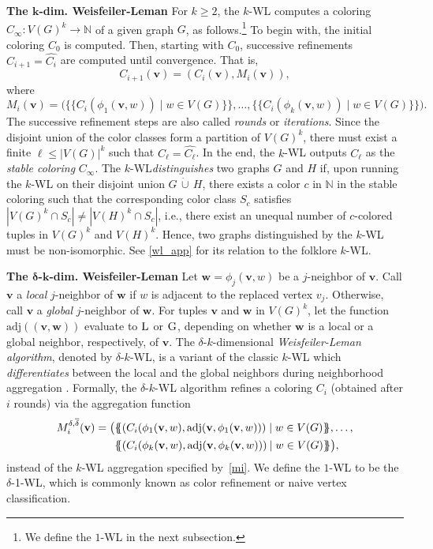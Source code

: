 \documentclass{article}
\newcommand{\xhdr}[1]{{\noindent\bfseries #1}}
\theoremstyle{definition}
\newcommand{\new}[1]{\emph{#1}}
\newcommand{\ndelta}{\ensuremath{\overline{\delta}}}
\renewcommand{\vec}[1]{\mathbf{#1}}
\newcommand{\kwl}{$k$-\textsf{WL}\xspace}
\newcommand{\deltakwl}{$\delta$-$k$-\textsf{WL}\xspace}
\begin{document}
\xhdr{The $\boldsymbol{k}$-dim. Weisfeiler-Leman} For $k\geq 2$, the \kwl computes a coloring $C_\infty \colon V(G)^k \to \mathbb{N}$ of a given graph $G$, as follows.\footnote{We define the $1$-\textsf{WL} in the next subsection.} To begin with, the initial coloring $C_0$ is computed. Then, starting with $C_0$, successive refinements $C_{i+1} = \widehat{C_i}$ are computed until convergence. That is,
\[
C_{i+1}(\vec{v}) = (C_i(\vec{v}), M_i(\vec{v})),
\]
where 
\begin{equation}\label{mi}
M_i(\vec{v}) =   \big( \{\!\! \{  C_i(\phi_1(\vec{v},w)) \mid w \in V(G) \} \!\!\}, \dots, \{\!\! \{  C_i(\phi_k(\vec{v},w)) \mid w \in V(G) \} \!\!\} \big).
\end{equation}
The successive refinement steps are also called \new{rounds} or \new{iterations}. Since the disjoint union of the color classes form a partition of $V(G)^k$, there must exist a finite $\ell \leq |V(G)|^k$ such that $C_{\ell} = \widehat{C_{\ell}}$. In the end, the \kwl outputs $C_\ell$ as the \emph{stable coloring} $C_\infty$. The \kwl \new{distinguishes} two graphs $G$ and $H$ if, upon running the \kwl on their disjoint union $G \,\dot\cup\, H$, there exists a color $c$ in $\mathbb{N}$ in the stable coloring such that the corresponding color class $S_c$ satisfies
$|V(G)^k \cap S_c| \neq |V(H)^k \cap S_c|$, i.e., there exist an unequal number of $c$-colored tuples in $V(G)^k$ and $V(H)^k$. Hence, two graphs distinguished by the \kwl must be non-isomorphic. See \cref{wl_app} for its relation to the folklore \kwl.

\xhdr{The $\boldsymbol{\delta}$-$\boldsymbol{k}$-dim. Weisfeiler-Leman} Let $\vec{w} = \phi_j(\vec{v},w)$ be a $j$-{neighbor} of $\vec{v}$. Call $\vec{v}$ a \new{local} $j$-neighbor of $\vec{w}$ if $w$ is adjacent to the replaced vertex $v_j$. Otherwise, call $\vec{v}$ a \new{global} $j$-neighbor of $\vec{w}$. For tuples $\vec{v}$ and $\vec{w}$ in $V(G)^k$, let the function $\textrm{adj}((\vec{v},\vec{w}))$ evaluate to $\textsc{L}$ or $\textsc{G}$, depending on whether $\vec{w}$ is a local or a global neighbor, respectively, of $\vec{v}$. The $\delta$-$k$-dimensional \new{Weisfeiler-Leman algorithm}, denoted by \deltakwl, is a variant of the classic \kwl which \emph{differentiates} between the local and the global neighbors during neighborhood aggregation \cite{Mal2014}. Formally, the \deltakwl algorithm refines a coloring $C_i$ (obtained after $i$ rounds) via the aggregation function 
\begin{equation}\label{mid}
\begin{split}
M^{\delta,\ndelta}_i(\vec{v}) =   \big( &\{\!\! \{  (C_i({\phi_1(\vec{v},w)}, \textrm{adj}(\vec{v}, \phi_1(\vec{v},w)     )) \mid w \in V(G) \} \!\!\}, \dots, \\ &\{\!\! \{  (C_i({\phi_k(\vec{v},w)}, \textrm{adj}(\vec{v},  \phi_k(\vec{v},w))) \hspace{-0.55pt}\mid w \in V(G) \}  \!\!\} \big),
\end{split}	
\end{equation}
instead of the \kwl aggregation specified by~\cref{mi}. We define the $1$-\textsf{WL} to be the $\delta$-1-\textsf{WL}, which is commonly known as color refinement or naive vertex classification.
\end{document}

